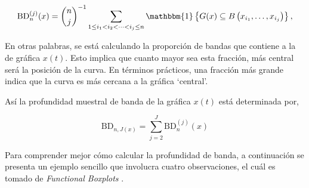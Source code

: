 \begin{equation}
    \mathrm{BD}_n^{(j)}(x)= \binom{n}{j}^{-1} \sum_{1 \leq i_1<i_2<\cdots<i_j \leq n} \mathbbm{1}\left\{G(x) \subseteq B\left(x_{i_1}, \ldots, x_{i_j}\right)\right\},
\end{equation}

En otras palabras, se está calculando la proporción de bandas que contiene a la de gráfica $x(t)$. Esto implica que cuanto mayor sea esta fracción, más central será la posición de la curva. En términos prácticos, una fracción más grande indica que la curva es más cercana a la gráfica `central'.

Así la profundidad muestral de banda de la gráfica $x(t)$ está determinada por, 

\begin{equation}
    \mathrm{BD}_{n, J(x)} = \sum_{j = 2}^{J} \mathrm{BD}_n^{(j)}(x)
\end{equation}

Para comprender mejor cómo calcular la profundidad de banda, a continuación se presenta un ejemplo sencillo que involucra cuatro observaciones, el cuál es tomado de \textit{Functional Boxplots} \cite{boxplotFun}.

